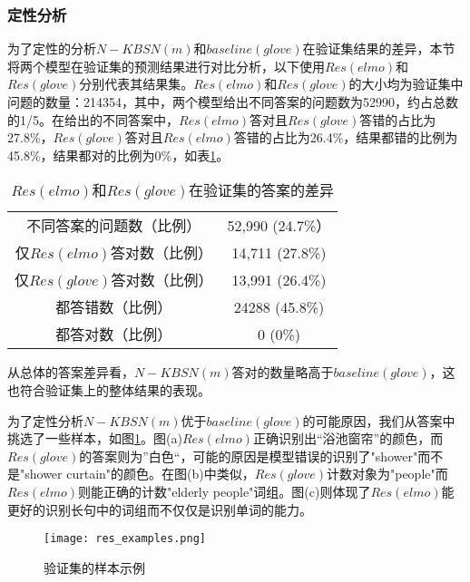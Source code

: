 \subsubsection{定性分析}
为了定性的分析$N-KBSN(m)$和$baseline(glove)$在验证集结果的差异，本节将两个模型在验证集的预测结果进行对比分析，以下使用$Res(elmo)$和$Res(glove)$分别代表其结果集。$Res(elmo)$和$Res(glove)$的大小均为验证集中问题的数量：214354，其中，两个模型给出不同答案的问题数为52990，约占总数的1/5。在给出的不同答案中，$Res(elmo)$答对且$Res(glove)$答错的占比为27.8\%，$Res(glove)$答对且$Res(elmo)$答错的占比为26.4\%，结果都错的比例为45.8\%，结果都对的比例为0\%，如表\ref{diff}。
\begin{table}[H]
\centering
\caption{$Res(elmo)$和$Res(glove)$在验证集的答案的差异}
\begin{tabular}{cc}
\toprule
不同答案的问题数（比例） & 52,990 (24.7\%）\\
仅$Res(elmo)$答对数（比例） & 14,711 (27.8\%)\\
仅$Res(glove)$答对数（比例） & 13,991 (26.4\%)\\
都答错数（比例）& 24288 (45.8\%)\\
都答对数（比例）& 0 (0\%) \\
\bottomrule
\end{tabular}
\label{diff}
\end{table}
从总体的答案差异看，$N-KBSN(m)$答对的数量略高于$baseline(glove)$，这也符合验证集上的整体结果的表现。

为了定性分析$N-KBSN(m)$优于$baseline(glove)$的可能原因，我们从答案中挑选了一些样本，如图\ref{res_examples}。图(a)$Res(elmo)$正确识别出“浴池窗帘”的颜色，而$Res(glove)$的答案则为”白色“，可能的原因是模型错误的识别了"shower"而不是"shower curtain"的颜色。在图(b)中类似，$Res(glove)$计数对象为"people"而$Res(elmo)$则能正确的计数"elderly people"词组。图(c)则体现了$Res(elmo)$能更好的识别长句中的词组而不仅仅是识别单词的能力。
\begin{figure}[H]
	\texttt{[image: res\_examples.png]}
	\caption{验证集的样本示例}
	\label{res_examples}
\end{figure}

